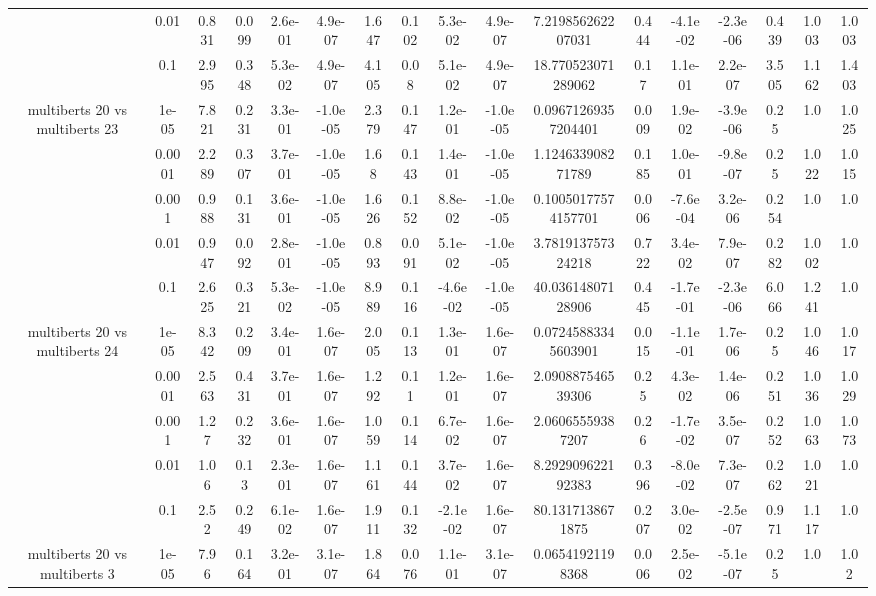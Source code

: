 \begin{tabular}{|c|c|c|c|c|c|c|c|c|c|c|c|c|c|c|c|c|}
 & 0.01 & 0.831 & 0.099 & 2.6e-01 & 4.9e-07 & 1.647 & 0.102 & 5.3e-02 & 4.9e-07 & 7.219856262207031 & 0.444 & -4.1e-02 & -2.3e-06 & 0.439 & 1.003 & 1.003 \\
 & 0.1 & 2.995 & 0.348 & 5.3e-02 & 4.9e-07 & 4.105 & 0.08 & 5.1e-02 & 4.9e-07 & 18.770523071289062 & 0.17 & 1.1e-01 & 2.2e-07 & 3.505 & 1.162 & 1.403 \\
\hline
\multirow{5}{*}{multiberts 20 vs multiberts 23} & 1e-05 & 7.821 & 0.231 & 3.3e-01 & -1.0e-05 & 2.379 & 0.147 & 1.2e-01 & -1.0e-05 & 0.09671269357204401 & 0.009 & 1.9e-02 & -3.9e-06 & 0.25 & 1.0 & 1.025 \\
 & 0.0001 & 2.289 & 0.307 & 3.7e-01 & -1.0e-05 & 1.68 & 0.143 & 1.4e-01 & -1.0e-05 & 1.124633908271789 & 0.185 & 1.0e-01 & -9.8e-07 & 0.25 & 1.022 & 1.015 \\
 & 0.001 & 0.988 & 0.131 & 3.6e-01 & -1.0e-05 & 1.626 & 0.152 & 8.8e-02 & -1.0e-05 & 0.10050177574157701 & 0.006 & -7.6e-04 & 3.2e-06 & 0.254 & 1.0 & 1.0 \\
 & 0.01 & 0.947 & 0.092 & 2.8e-01 & -1.0e-05 & 0.893 & 0.091 & 5.1e-02 & -1.0e-05 & 3.781913757324218 & 0.722 & 3.4e-02 & 7.9e-07 & 0.282 & 1.002 & 1.0 \\
 & 0.1 & 2.625 & 0.321 & 5.3e-02 & -1.0e-05 & 8.989 & 0.116 & -4.6e-02 & -1.0e-05 & 40.03614807128906 & 0.445 & -1.7e-01 & -2.3e-06 & 6.066 & 1.241 & 1.0 \\
\hline
\multirow{5}{*}{multiberts 20 vs multiberts 24} & 1e-05 & 8.342 & 0.209 & 3.4e-01 & 1.6e-07 & 2.005 & 0.113 & 1.3e-01 & 1.6e-07 & 0.07245883345603901 & 0.015 & -1.1e-01 & 1.7e-06 & 0.25 & 1.046 & 1.017 \\
 & 0.0001 & 2.563 & 0.431 & 3.7e-01 & 1.6e-07 & 1.292 & 0.11 & 1.2e-01 & 1.6e-07 & 2.090887546539306 & 0.25 & 4.3e-02 & 1.4e-06 & 0.251 & 1.036 & 1.029 \\
 & 0.001 & 1.27 & 0.232 & 3.6e-01 & 1.6e-07 & 1.059 & 0.114 & 6.7e-02 & 1.6e-07 & 2.06065559387207 & 0.26 & -1.7e-02 & 3.5e-07 & 0.252 & 1.063 & 1.073 \\
 & 0.01 & 1.06 & 0.13 & 2.3e-01 & 1.6e-07 & 1.161 & 0.144 & 3.7e-02 & 1.6e-07 & 8.292909622192383 & 0.396 & -8.0e-02 & 7.3e-07 & 0.262 & 1.021 & 1.0 \\
 & 0.1 & 2.52 & 0.249 & 6.1e-02 & 1.6e-07 & 1.911 & 0.132 & -2.1e-02 & 1.6e-07 & 80.1317138671875 & 0.207 & 3.0e-02 & -2.5e-07 & 0.971 & 1.117 & 1.0 \\
\hline
\multirow{5}{*}{multiberts 20 vs multiberts 3} & 1e-05 & 7.96 & 0.164 & 3.2e-01 & 3.1e-07 & 1.864 & 0.076 & 1.1e-01 & 3.1e-07 & 0.06541921198368 & 0.006 & 2.5e-02 & -5.1e-07 & 0.25 & 1.0 & 1.02 \\

\end{tabular}
